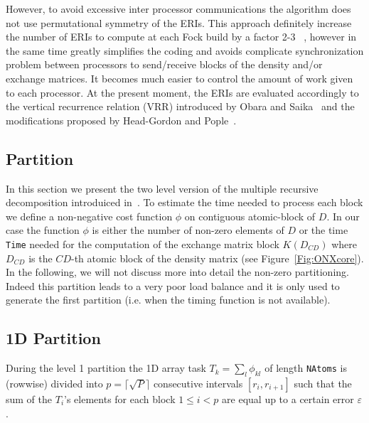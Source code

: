 \documentclass[prl,twocolumn,showpacs,twocolumngrid,superbib]{revtex4}
\begin{document}
 However, to avoid excessive inter processor communications the algorithm 
 does not use permutational symmetry of the ERIs. This approach
 definitely increase the number of ERIs to compute at each Fock build by a factor 2-3~\cite{ESchwegler00} ,
 however in the same time greatly simplifies the coding and avoids complicate
 synchronization problem between processors to send/receive blocks of the 
 density and/or exchange matrices. It becomes much 
 easier to control the amount of work given to each processor.
 At the present moment, the ERIs are evaluated accordingly to
 the vertical recurrence relation (VRR) introduced by Obara 
 and Saika~\cite{SObara86} and the modifications proposed by Head-Gordon
 and Pople~\cite{MGordon88}.




\subsection{Partition}
 In this section we present the two level version of the multiple recursive 
 decomposition introduiced in~\cite{LRomero95}.
 To estimate the time needed to process each block we define
 a non-negative cost function $\phi$ on contiguous atomic-block of
 $D$. In our case the function $\phi$ is either the number of 
 non-zero elements of $D$ or the time {\tt Time} needed for the computation
 of the exchange matrix block $K(D_{CD})$ where $D_{CD}$ is the
 $CD$-th atomic block of the density matrix (see Figure~\ref{Fig:ONXcore}). In the following, 
 we will not discuss more into detail the non-zero partitioning.
 Indeed this partition leads to a very poor load balance and it is
 only used to generate the first partition (i.e. when 
 the timing function is not available). 

\subsection{1D Partition}
 During the level 1 partition the 1D array task $T_k=\sum_l\phi_{kl}$ of length {\tt NAtoms}
 is (rowwise) divided into $p=\lceil\sqrt{P}\rceil$ consecutive intervals $[r_i,r_{i+1}]$ such
 that the sum of the $T_i$'s elements for
 each block $1 \le i < p$ are equal up to a certain error
 $\varepsilon$. 
\end{document}
